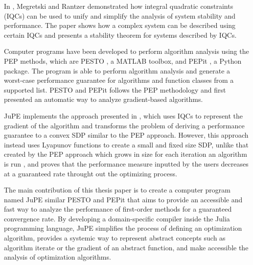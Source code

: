In \cite{iqc}, Megretski and Rantzer demonstrated how integral quadratic constraints (IQCs) can be used to unify and simplify the analysis of system stability and performance. The paper shows how a complex system can be described using certain IQCs and presents a stability theorem for systems described by IQCs. 

Computer programs have been developed to perform algorithm analysis using the PEP methods, which are PESTO \cite{pesto}, a MATLAB toolbox, and PEPit \cite{pepit}, a Python package. The program is able to perform algorithm analysis and generate a worst-case performance guarantee for algorithms and function classes from a supported list. PESTO and PEPit follows the PEP methodology and first presented an automatic way to analyze gradient-based algorithms. 

JuPE implements the approach presented in \cite{tutorial}, which uses IQCs to represent the gradient of the algorithm and transforms the problem of deriving a performance guarantee to a convex SDP similar to the PEP approach. However, this approach instead uses Lyapunov functions to create a small and fixed size SDP, unlike that created by the PEP approach which grows in size for each iteration an algorithm is run , and proves that the performance measure inputted  by the users decreases at a guaranteed rate throught out the optimizing process.

The main contribution of this thesis paper is to create a computer program named JuPE  similar PESTO and PEPit that aims to provide an accessible and fast way to analyze the performance of first-order methods for a guaranteed convergence rate. By developing a domain-specific compiler inside the Julia programming language, JuPE simplifies the process of defining an optimization algorithm, provides a systemic way to represent abstract concepts such as algorithm iterate or the gradient of an abstract function, and make accessible the analysis of optimization algorithms.